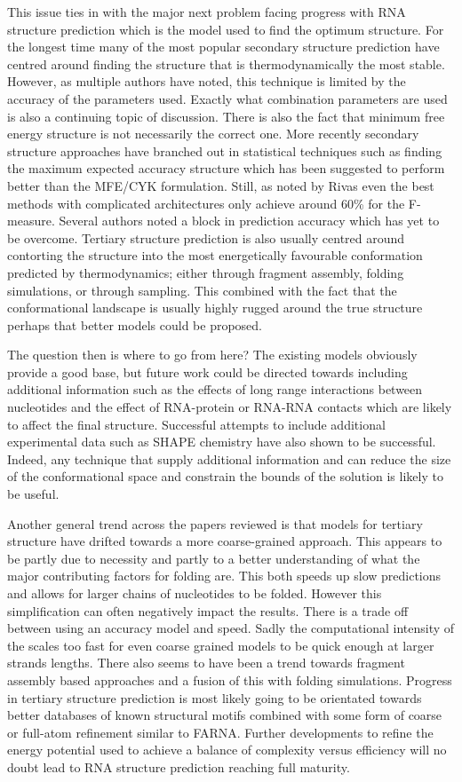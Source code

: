 \documentclass[journal]{IEEEtran}
\begin{document}
This issue ties in with the major next problem facing progress with RNA structure prediction which is the model used to find the optimum structure. For the longest time many of the most popular secondary structure prediction have centred around finding the structure that is thermodynamically the most stable. However, as multiple authors have noted, this technique is limited by the accuracy of the parameters used. Exactly what combination parameters are used is also a continuing topic of discussion. There is also the fact that minimum free energy structure is not necessarily the correct one. More recently secondary structure approaches have branched out in statistical techniques such as finding the maximum expected accuracy structure which has been suggested to perform better than the MFE/CYK formulation. Still, as noted by Rivas \cite{rivas2013four} even the best methods with complicated architectures only achieve around 60\% for the F-measure. Several authors noted a block in prediction accuracy which has yet to be overcome. Tertiary structure prediction is also usually centred around contorting the structure into the most energetically favourable conformation predicted by thermodynamics; either through fragment assembly, folding simulations, or through sampling. This combined with the fact that the conformational landscape is usually highly rugged around the true structure perhaps that better models could be proposed. 

The question then is where to go from here? The existing models obviously provide a good base, but future work could be directed towards including additional information such as the effects of long range interactions between nucleotides and the effect of RNA-protein or RNA-RNA contacts which are likely to affect the final structure. Successful attempts to include additional experimental data such as SHAPE chemistry have also shown to be successful. Indeed, any technique that supply additional information and can reduce the size of the conformational space and constrain the bounds of the solution is likely to be useful.

Another general trend across the papers reviewed is that models for tertiary structure have drifted towards a more coarse-grained approach. This appears to be partly due to necessity and partly to a better understanding of what the major contributing factors for folding are. This both speeds up slow predictions and allows for larger chains of nucleotides to be folded. However this simplification can often negatively impact the results. There is a trade off between using an accuracy model and speed. Sadly the computational intensity of the scales too fast for even coarse grained models to be quick enough at larger strands lengths. There also seems to have been a trend towards fragment assembly based approaches and a fusion of this with folding simulations. Progress in tertiary structure prediction is most likely going to be orientated towards better databases of known structural motifs combined with some form of coarse or full-atom refinement similar to FARNA. Further developments to refine  the energy potential used to achieve a balance of complexity versus efficiency will no doubt lead to RNA structure prediction reaching full maturity.
\end{document}
